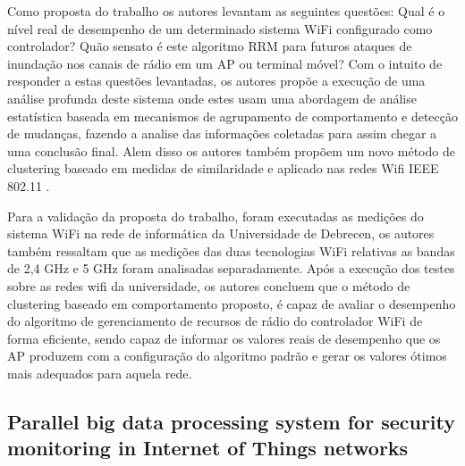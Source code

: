 \documentclass[ti,table]{texufpel} %
\begin{document}
	 Como proposta do trabalho os autores levantam as seguintes questões: Qual é o nível real de desempenho de um determinado sistema WiFi configurado como controlador? Quão sensato é este algoritmo RRM para futuros ataques de inundação nos canais de rádio em um AP ou terminal móvel? Com o intuito de responder a estas questões levantadas, os autores propõe a execução de uma análise profunda deste sistema onde estes usam uma  abordagem de análise estatística baseada em mecanismos de agrupamento de comportamento e detecção de mudanças, fazendo a analise das informações coletadas para assim chegar a uma conclusão final. Alem disso os autores também propõem um novo método de clustering baseado em medidas de similaridade e aplicado nas redes Wifi IEEE 802.11 \cite{art7gal2017anaysis}.		
	
	 Para a validação da proposta do trabalho, foram executadas as medições do sistema WiFi na rede de informática da Universidade de Debrecen, os autores também ressaltam que as medições das duas tecnologias WiFi relativas as bandas de 2,4 GHz e 5 GHz foram analisadas separadamente. Após a execução dos testes sobre as redes wifi da universidade, os autores concluem que o método de clustering baseado em comportamento proposto, é capaz de avaliar o desempenho do algoritmo de gerenciamento de recursos de rádio do controlador WiFi de forma eficiente, sendo capaz de informar os valores reais de desempenho que os AP produzem com a configuração do algoritmo padrão e gerar os valores ótimos mais adequados para aquela rede.



\subsection{Parallel big data processing system for security monitoring in Internet of Things networks}
\end{document}
